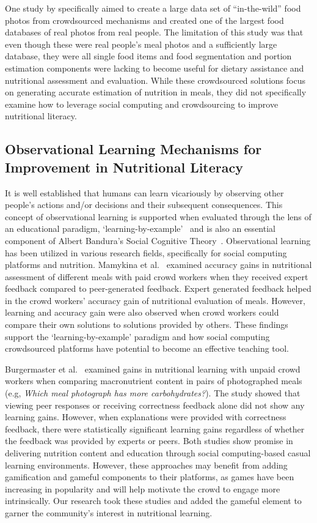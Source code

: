 One study by \cite{merler2016snap} specifically aimed to create a large data set of ``in-the-wild'' food photos from crowdsourced mechanisms and created one of the largest food databases of real photos from real people. The limitation of this study was that even though these were real people’s meal photos and a sufficiently large database, they were all single food items and food segmentation and portion estimation components were lacking to become useful for dietary assistance and nutritional assessment and evaluation. While these crowdsourced solutions focus on generating accurate estimation of nutrition in meals, they did not specifically examine how to leverage social computing and crowdsourcing to improve nutritional literacy. 

\subsection{Observational Learning Mechanisms for Improvement in Nutritional Literacy}
It is well established that humans can learn vicariously by observing other people's actions and/or decisions and their subsequent consequences. This concept of observational learning is supported when evaluated through the lens of an educational paradigm, `learning-by-example’~\cite{anderson1997role,atkinson2000learning,brown1988preschool} and is also an essential component of Albert Bandura's Social Cognitive Theory~\cite{bandura1989human,bandura1998health}. Observational learning has been utilized in various research fields, specifically for social computing platforms and nutrition. Mamykina et al.~\cite{mamykina2016learning} examined accuracy gains in nutritional assessment of different meals with paid crowd workers when they received expert feedback compared to peer-generated feedback. Expert generated feedback helped in the crowd workers' accuracy gain of nutritional evaluation of meals. However, learning and accuracy gain were also observed when crowd workers could compare their own solutions to solutions provided by others. These findings support the `learning-by-example’ paradigm and how social computing crowdsourced platforms have potential to become an effective teaching tool. 

Burgermaster et al.~\cite{burgermaster2017role} examined gains in nutritional learning with unpaid crowd workers when comparing macronutrient content in pairs of photographed meals (e.g, \textit{Which meal photograph has more carbohydrates?}). The study showed that viewing peer responses or receiving correctness feedback alone did not show any learning gains. However, when explanations were provided with correctness feedback, there were statistically significant learning gains regardless of whether the feedback was provided by experts or peers. Both studies show promise in delivering nutrition content and education through social computing-based casual learning environments. However, these approaches may benefit from adding gamification and gameful components to their platforms, as games have been increasing in popularity and will help motivate the crowd to engage more intrinsically. Our research took these studies and added the gameful element to garner the community's interest in nutritional learning. 

